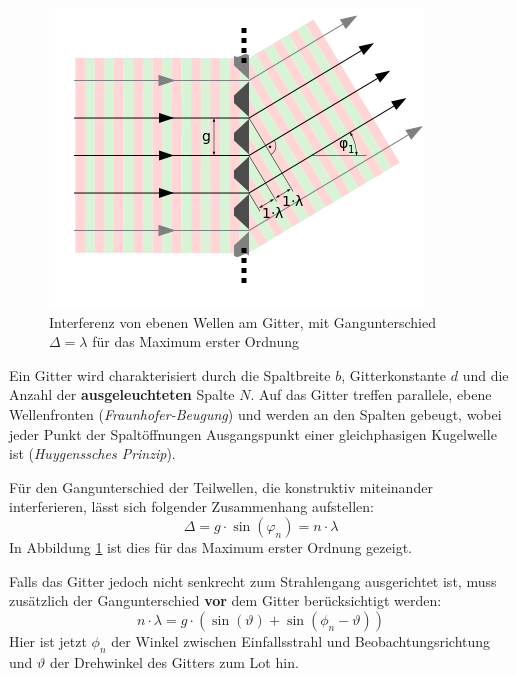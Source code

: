 \documentclass[a4paper, 11pt]{article}
\begin{document}
\begin{figure}[H]
	\centering
	\includegraphics[scale=0.8]{./Bilder/Beugungsgitter-erstes-Maximum.png}
	\caption{Interferenz von ebenen Wellen am Gitter, mit Gangunterschied $\Delta=\lambda$ für das Maximum erster Ordnung \protect \footnotemark}
	\label{pic:Gitter}	
\end{figure}

Ein Gitter wird charakterisiert durch die Spaltbreite $b$, Gitterkonstante $d$ und die Anzahl der \textbf{ausgeleuchteten} Spalte $N$. Auf das Gitter treffen parallele, ebene Wellenfronten (\textit{Fraunhofer-Beugung}) und werden an den Spalten gebeugt, wobei jeder Punkt der Spaltöffnungen Ausgangspunkt einer gleichphasigen Kugelwelle ist (\textit{Huygenssches Prinzip}).

Für den Gangunterschied  der Teilwellen, die konstruktiv miteinander interferieren, lässt sich folgender Zusammenhang aufstellen:
\begin{equation}\label{eq:IGitter}
\Delta = g \cdot \sin(\varphi_n) = n \cdot \lambda
\end{equation}
In Abbildung \ref{pic:Gitter} ist dies für das Maximum erster Ordnung gezeigt.

Falls das Gitter jedoch nicht senkrecht zum Strahlengang ausgerichtet ist, muss zusätzlich der Gangunterschied \textbf{vor} dem Gitter berücksichtigt werden:
\begin{equation}\label{eq:GitterVerdreht}
n \cdot \lambda = g \cdot (\sin(\vartheta)+\sin(\phi_n-\vartheta))
\end{equation}
Hier ist jetzt $\phi_n$ der Winkel zwischen Einfallsstrahl und Beobachtungsrichtung und $\vartheta$ der Drehwinkel des Gitters zum Lot hin.
\end{document}

